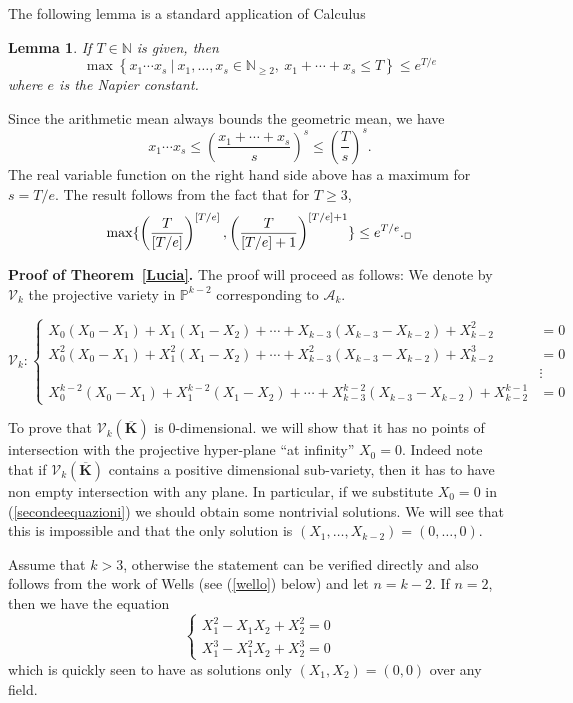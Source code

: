 \documentclass[a4paper,twoside]{article}
\newtheorem{Lemma}{Lemma}[section]
\begin{document}
The following lemma is a standard application of Calculus

\begin{Lemma}\label{max} If $T\in\mathbb N$ is given, then
$$\max\left\{x_1\cdots x_s\ |\ x_1,\ldots,x_s\in\mathbb N_{\geq2},\ x_1+\cdots+x_s\leq T\right\}\leq e^{T/e}$$
where $e$ is the Napier constant.
\end{Lemma}

 Since the arithmetic mean always
bounds the geometric mean, we have
$$x_1\cdots x_s\leq \left(\frac{x_1+\cdots+x_s}{s}\right)^s\leq
\left(\frac{T}{s}\right)^s.$$
The real variable function on the right hand side above has a maximum for
$s=T/e$. The result follows from the fact that for $T\geq3$,
$$\max\{\left(\frac{T}{[T/e]}\right)^{[T/e]},\left(\frac{T}{[T/e]+1}\right)^{[T/e]+1}\}\leq e^{T/e}.\hfill_\Box$$\medskip

\noindent\textbf{Proof of Theorem~\ref{Lucia}.} The proof will proceed as follows:
We denote by $\mathcal V_k$ the projective variety in $\mathbb P^{k-2}$
corresponding to $\mathcal A_k$.
\begin{scriptsize}
\begin{equation}\mathcal V_k:\label{secondeequazioni}
\!\left\{\!\!\begin{array}{rl}
X_0(X_0-X_1)+X_1(X_1-X_2)+\cdots +X_{k-3}(X_{k-3}-X_{k-2})+X_{k-2}^{2}&=0\\
X_0^2(X_0-X_1)+X_1^2(X_1-X_2)+\cdots +X_{k-3}^2(X_{k-3}-X_{k-2})+X_{k-2}^{3}&=0\\
& \vdots \\
X_0^{k-2}(X_0-X_1)+X_1^{k-2}(X_1-X_2)+\cdots+ X_{k-3}^{k-2}(X_{k-3}-X_{k-2})+X_{k-2}^{k-1}&=0
\end{array}\right.\end{equation}
\end{scriptsize}

To prove that $\mathcal V_k(\overline{\mathbf K})$ is
$0$-dimensional. we will show that it has no points of
intersection with the projective hyper-plane ``at infinity''
$X_0=0$. Indeed note that if $\mathcal V_k(\overline{\mathbf K})$
contains a positive dimensional sub-variety, then it has to have
non empty intersection with any plane. In particular, if we
substitute $X_0=0$ in (\ref{secondeequazioni}) we should obtain
some nontrivial solutions. We will see that this is impossible and
that the only solution is $(X_1,\ldots,X_{k-2})=(0,\ldots,0)$.

Assume that $k>3$, otherwise the statement can be verified directly and also
follows from the work of Wells \cite{W} (see (\ref{wello}) below) and let $n=k-2$.
If $n=2$, then we have the equation
$$\left\{\begin{array}{l}
X_1^2-X_1X_2+X_2^2=0\\
X_1^3-X_1^2X_2+X_2^3=0
\end{array}\right.$$
which is quickly seen to have as solutions only $(X_1,X_2)=(0,0)$ over
any field.
\end{document}
